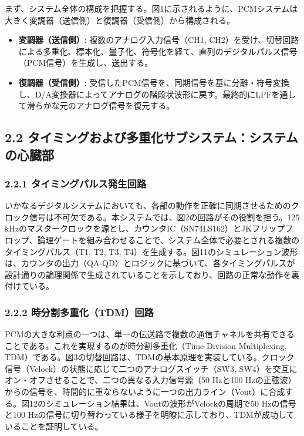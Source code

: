 \documentclass[
  a4paper,  %
  11pt,     %
]{ltjsarticle}%
\begin{document}
まず、システム全体の構成を把握する。図1に示されるように、PCMシステムは大きく変調器（送信側）と復調器（受信側）から構成される\cite{ref1}。
\begin{itemize}
    \item \textbf{変調器（送信側）}: 複数のアナログ入力信号（CH1, CH2）を受け、切替回路による多重化、標本化、量子化、符号化を経て、直列のデジタルパルス信号（PCM信号）を生成し、送出する。
    \item \textbf{復調器（受信側）}: 受信したPCM信号を、同期信号を基に分離・符号変換し、D/A変換器によってアナログの階段状波形に戻す。最終的にLPFを通して滑らかな元のアナログ信号を復元する。
\end{itemize}

\subsection{2.2 タイミングおよび多重化サブシステム：システムの心臓部}

\subsubsection{2.2.1 タイミングパルス発生回路}

いかなるデジタルシステムにおいても、各部の動作を正確に同期させるためのクロック信号は不可欠である。本システムでは、図2の回路がその役割を担う\cite{ref1}。125 kHzのマスタークロックを源とし、カウンタIC（SN74LS162）とJKフリップフロップ、論理ゲートを組み合わせることで、システム全体で必要とされる複数のタイミングパルス（T1, T2, T3, T4）を生成する。図11のシミュレーション波形は、カウンタの出力（QA-QD）とロジックに基づいて、各タイミングパルスが設計通りの論理関係で生成されていることを示しており、回路の正常な動作を裏付けている\cite{ref1}。

\subsubsection{2.2.2 時分割多重化（TDM）回路}

PCMの大きな利点の一つは、単一の伝送路で複数の通信チャネルを共有できることである。これを実現するのが時分割多重化（Time-Division Multiplexing, TDM）である。図3の切替回路は、TDMの基本原理を実装している\cite{ref1}。クロック信号（Vclock）の状態に応じて二つのアナログスイッチ（SW3, SW4）を交互にオン・オフさせることで、二つの異なる入力信号源（50 Hzと100 Hzの正弦波）からの信号を、時間的に重ならないように一つの出力ライン（Vout）に合成する。図12のシミュレーション結果は、Voutの波形がVclockの周期で50 Hzの信号と100 Hzの信号に切り替わっている様子を明瞭に示しており、TDMが成功していることを証明している\cite{ref1}。
\end{document}
